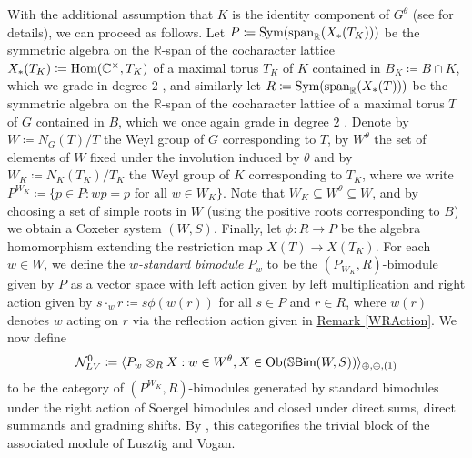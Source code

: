 \noindent With the additional assumption that $K$ is the identity component of $G^\theta$ (see \cite{LR22} for details), we can proceed as follows. Let $P \coloneqq \textnormal{Sym}(\textnormal{span}_\mathbb{R}(X_*(T_K)))$ be the symmetric algebra on the $\mathbb{R}$-span of the cocharacter lattice $X_*(T_K) \coloneqq \textnormal{Hom}(\mathbb{C}^\times, T_K)$ of a maximal torus $T_K$ of $K$ contained in $B_K \coloneqq B \cap K$, which we grade in degree $2$%
, and similarly let $R \coloneqq \textnormal{Sym}(\textnormal{span}_\mathbb{R}(X_*(T)))$ be the symmetric algebra on the $\mathbb{R}$-span of the cocharacter lattice of a maximal torus $T$ of $G$ contained in $B$, which we once again grade in degree $2$%
. Denote by $W \coloneqq N_G(T)/T$ the Weyl group of $G$ corresponding to $T$, by $W^\theta$ the set of elements of $W$ fixed under the involution induced by $\theta$ and by $W_K \coloneqq N_K(T_K)/T_K$ the Weyl group of $K$ corresponding to $T_K$, where we write $P^{W_K} \coloneqq \{p \in P : wp = p\text{ for all }w \in W_K\}$. Note that $W_K \subseteq W^\theta \subseteq W$, and by choosing a set of simple roots in $W$ (using the positive roots corresponding to $B$) we obtain a Coxeter system $(W, S)$. Finally, let $\phi : R \to P$ be the algebra homomorphism extending the restriction map $X(T) \to X(T_K)$. For each $w \in W$, we define the {\em $w$-standard bimodule} $P_w$ to be the $(P_{W_K}, R)$-bimodule given by $P$ as a vector space with left action given by left multiplication and right action given by $s\cdot_w r \coloneqq s\phi(w(r))$ for all $s \in P$ and $r \in R$, where $w(r)$ denotes $w$ acting on $r$ via the reflection action given in \hyperref[WRAction]{Remark \ref*{WRAction}}. We now define\\[-1.1\linespacing]
\begin{align*}
\begin{split}
\mathcal{N}_{LV}^0 \coloneqq \langle P_w \otimes_R X : w \in W^\theta, X \in \textnormal{Ob}(\mathbb{S}\textnormal{\textsf{Bim}}(W, S))\rangle_{\oplus,\ominus,(1)}
\end{split}
\end{align*}
\noindent to be the category of $(P^{W_K}, R)$-bimodules generated by standard bimodules under the right action of Soergel bimodules and closed under direct sums, direct summands and gradning shifts. By \cite[Theorem 1.3.1]{LR22}, this categorifies the trivial block of the associated module of Lusztig and Vogan.\\

